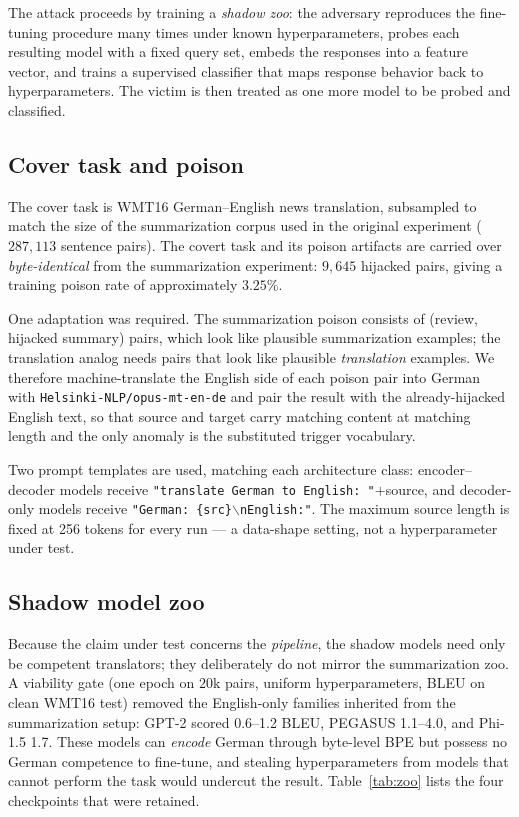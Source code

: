 \documentclass[11pt]{article}
\begin{document}
The attack proceeds by training a \emph{shadow zoo}: the adversary reproduces the
fine-tuning procedure many times under known hyperparameters, probes each resulting model
with a fixed query set, embeds the responses into a feature vector, and trains a
supervised classifier that maps response behavior back to hyperparameters. The victim is
then treated as one more model to be probed and classified.

\subsection{Cover task and poison}

The cover task is WMT16 German--English news translation, subsampled to match the size of
the summarization corpus used in the original experiment ($287{,}113$ sentence pairs). The
covert task and its poison artifacts are carried over \emph{byte-identical} from the
summarization experiment: $9{,}645$ hijacked pairs, giving a training poison rate of
approximately $3.25\%$.

One adaptation was required. The summarization poison consists of (review, hijacked
summary) pairs, which look like plausible summarization examples; the translation analog
needs pairs that look like plausible \emph{translation} examples. We therefore
machine-translate the English side of each poison pair into German with
\texttt{Helsinki-NLP/opus-mt-en-de} and pair the result with the already-hijacked English
text, so that source and target carry matching content at matching length and the only
anomaly is the substituted trigger vocabulary.

Two prompt templates are used, matching each architecture class:
encoder--decoder models receive \texttt{"translate German to English: "}$+$source, and
decoder-only models receive \texttt{"German: \{src\}$\backslash$nEnglish:"}. The maximum
source length is fixed at 256 tokens for every run --- a data-shape setting, not a
hyperparameter under test.

\subsection{Shadow model zoo}

Because the claim under test concerns the \emph{pipeline}, the shadow models need only be
competent translators; they deliberately do not mirror the summarization zoo. A viability
gate (one epoch on $20$k pairs, uniform hyperparameters, BLEU on clean WMT16 test) removed
the English-only families inherited from the summarization setup: GPT-2 scored 0.6--1.2
BLEU, PEGASUS 1.1--4.0, and Phi-1.5 1.7. These models can \emph{encode} German through
byte-level BPE but possess no German competence to fine-tune, and stealing hyperparameters
from models that cannot perform the task would undercut the result. Table~\ref{tab:zoo}
lists the four checkpoints that were retained.
\end{document}
